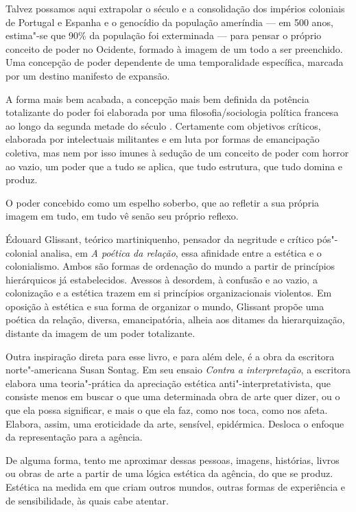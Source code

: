 Talvez possamos aqui extrapolar o século  e a consolidação dos
impérios coloniais de Portugal e Espanha e o genocídio da população
ameríndia --- em 500 anos, estima"-se que 90\% da população foi exterminada
--- para pensar o próprio conceito de poder no Ocidente, formado à imagem
de um todo a ser preenchido. Uma concepção de poder dependente de uma
temporalidade específica, marcada por um destino manifesto de expansão.

A forma mais bem acabada, a concepção mais bem definida da potência
totalizante do poder foi elaborada por uma filosofia/sociologia
política francesa ao longo da segunda metade do século . Certamente
com objetivos críticos, elaborada por intelectuais militantes e em luta
por formas de emancipação coletiva, mas nem por isso imunes à sedução de
um conceito de poder com horror ao vazio, um poder que a tudo se aplica,
que tudo estrutura, que tudo domina e produz.

O poder concebido como um espelho soberbo, que ao refletir a sua própria
imagem em tudo, em tudo vê senão seu próprio reflexo.

\asterisc

Édouard Glissant, teórico martiniquenho, pensador da negritude e crítico
pós"-colonial analisa, em \emph{A poética da relação}, essa afinidade
entre a estética e o colonialismo. Ambos são formas de ordenação do
mundo a partir de princípios hierárquicos já estabelecidos. Avessos à
desordem, à confusão e ao vazio, a colonização e a estética trazem em si
princípios organizacionais violentos. Em oposição à estética e sua forma
de organizar o mundo, Glissant propõe uma poética da relação, diversa,
emancipatória, alheia aos ditames da hierarquização, distante da imagem
de um poder totalizante.

\asterisc

Outra inspiração direta para esse livro, e para além dele, é a obra da
escritora norte"-americana Susan Sontag. Em seu ensaio \emph{Contra a
interpretação}, a escritora elabora uma teoria"-prática da apreciação estética
anti"-interpretativista, que consiste menos em buscar o que uma
determinada obra de arte quer dizer, ou o que ela possa significar, e
mais o que ela faz, como nos toca, como nos afeta. Elabora, assim, uma
eroticidade da arte, sensível, epidérmica. Desloca o enfoque da
representação para a agência.

De alguma forma, tento me aproximar dessas pessoas, imagens, histórias,
livros ou obras de arte a partir de uma lógica estética da agência, do
que se produz. Estética na medida em que criam outros mundos, outras
formas de experiência e de sensibilidade, às quais cabe atentar.

